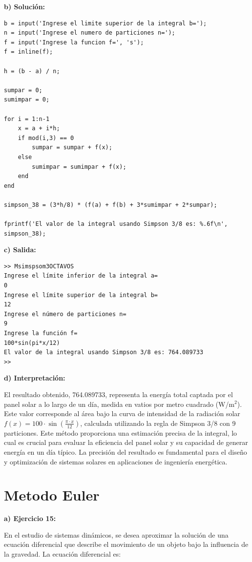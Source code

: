 \documentclass[12pt,a4paper,twoside]{article}  %
\begin{document}
\textbf{b) Solución:}

\begin{lstlisting}
b = input('Ingrese el limite superior de la integral b=');
n = input('Ingrese el numero de particiones n=');
f = input('Ingrese la funcion f=', 's');
f = inline(f);

h = (b - a) / n;

sumpar = 0;
sumimpar = 0;

for i = 1:n-1
    x = a + i*h;
    if mod(i,3) == 0
        sumpar = sumpar + f(x);
    else
        sumimpar = sumimpar + f(x);
    end
end

simpson_38 = (3*h/8) * (f(a) + f(b) + 3*sumimpar + 2*sumpar);

fprintf('El valor de la integral usando Simpson 3/8 es: %.6f\n', simpson_38);

\end{lstlisting}

\textbf{c) Salida:}

\begin{verbatim}
>> Msimspsom3OCTAVOS
Ingrese el límite inferior de la integral a=
0
Ingrese el límite superior de la integral b=
12
Ingrese el número de particiones n=
9
Ingrese la función f=
100*sin(pi*x/12)
El valor de la integral usando Simpson 3/8 es: 764.089733
>> 
\end{verbatim}

\textbf{d) Interpretación:}

El resultado obtenido, 764.089733, representa la energía total captada por el panel solar a lo largo de un día, medida en vatios por metro cuadrado (W/m\(^2\)). Este valor corresponde al área bajo la curva de intensidad de la radiación solar \( f(x) = 100 \cdot \sin\left(\frac{\pi \cdot x}{12}\right) \), calculada utilizando la regla de Simpson 3/8 con 9 particiones. Este método proporciona una estimación precisa de la integral, lo cual es crucial para evaluar la eficiencia del panel solar y su capacidad de generar energía en un día típico. La precisión del resultado es fundamental para el diseño y optimización de sistemas solares en aplicaciones de ingeniería energética.

\section{Metodo Euler }


\textbf{a) Ejercicio 15: }

En el estudio de sistemas dinámicos, se desea aproximar la solución de una ecuación diferencial que describe el movimiento de un objeto bajo la influencia de la gravedad. La ecuación diferencial es:
\end{document}
